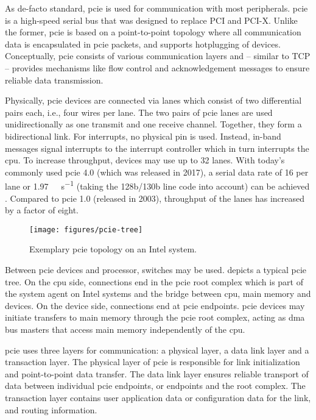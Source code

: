 As de-facto standard, \acf{pcie} is used for communication with most
peripherals. \ac{pcie} is a high-speed serial bus that was designed to replace
PCI and PCI-X. Unlike the former, \ac{pcie} is based on a point-to-point
topology where all communication data is encapsulated in \ac{pcie} packets, and
supports hotplugging of devices. Conceptually, \ac{pcie} consists of various
communication layers and -- similar to TCP -- provides mechanisms like flow
control and acknowledgement messages to ensure reliable data transmission.

Physically, \ac{pcie} devices are connected via lanes which consist of two
differential pairs each, i.e., four wires per lane. The two pairs of \ac{pcie}
lanes are used unidirectionally as one transmit and one receive channel.
Together, they form a bidirectional link. For interrupts, no physical pin is
used. Instead, in-band messages signal interrupts to the interrupt controller
which in turn interrupts the \ac{cpu}. To increase throughput, devices may use
up to 32 lanes. With today's commonly used \ac{pcie} 4.0 (which was released in
2017), a serial data rate of \SI{16}{\Gbps} per lane or
\SI{1.97}{\giga\byte\per\second} (taking the 128b/130b line code into account)
can be achieved \cite{pcie2017specification}. Compared to \ac{pcie} 1.0
(released in 2003), throughput of the lanes has increased by a factor of eight.

\begin{figure}
    \centering
    \texttt{[image: figures/pcie-tree]}
    \caption{Exemplary \acs{pcie} topology on an Intel system.}
    \label{fig:pcie-topology}
\end{figure}

Between \ac{pcie} devices and processor, switches may be used.
 depicts a typical \ac{pcie} tree. On the \ac{cpu} side,
connections end in the \ac{pcie} root complex which is part of the system agent
on Intel systems and the bridge between \ac{cpu}, main memory and devices. On
the device side, connections end at \ac{pcie} endpoints. \ac{pcie} devices may
initiate transfers to main memory through the \ac{pcie} root complex, acting as
\acs{dma} bus masters that access main memory independently of the \ac{cpu}.

\ac{pcie} uses three layers for communication: a physical layer, a data link
layer and a transaction layer. The physical layer of \ac{pcie} is responsible
for link initialization and point-to-point data transfer. The data link layer
ensures reliable transport of data between individual \ac{pcie} endpoints, or
endpoints and the root complex. The transaction layer contains user application
data or configuration data for the link, and routing information.

